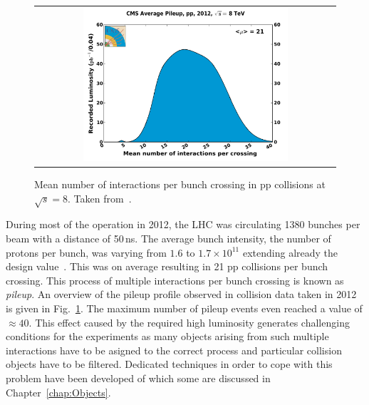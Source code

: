 \begin{figure}[!tp]
  \centering
  \begin{tabular}{c}
    \includegraphics[width=0.7\textwidth]{figures/pileup_pp_2012.pdf} 
  \end{tabular}
  \caption{Mean number of interactions per bunch crossing in pp collisions at $\sqrt{s} = 8$\tev. Taken from~\cite{bib:lhc:lumi12}.}
  \label{fig:lhc_pileup}
\end{figure}
During most of the operation in 2012, the LHC was circulating 1380 bunches per beam with a distance of 50\,ns. The average bunch intensity, \ie the number of protons per bunch, was varying from $1.6$ to $1.7 \times 10^{11}$ extending already the design value~\cite{bib:lhc:lumi12, Lamont:2013cma}. This was on average resulting in 21 pp collisions per bunch crossing. This process of multiple interactions per bunch crossing is known as \textit{pileup}. An overview of the pileup profile observed in collision data taken in 2012 is given in Fig.~\ref{fig:lhc_pileup}. The maximum number of pileup events even reached a value of $\approx 40$. This effect caused by the required high luminosity generates challenging conditions for the experiments as many objects arising from such multiple interactions have to be asigned to the correct process and particular collision objects have to be filtered. Dedicated techniques in order to cope with this problem have been developed of which some are discussed in Chapter~\ref{chap:Objects}.

